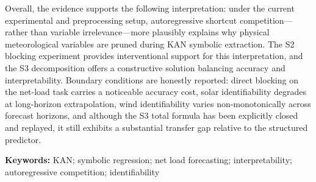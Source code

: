 Overall, the evidence supports the following interpretation: under the current experimental and preprocessing setup, autoregressive shortcut competition---rather than variable irrelevance---more plausibly explains why physical meteorological variables are pruned during KAN symbolic extraction. The S2 blocking experiment provides interventional support for this interpretation, and the S3 decomposition offers a constructive solution balancing accuracy and interpretability. Boundary conditions are honestly reported: direct blocking on the net-load task carries a noticeable accuracy cost, solar identifiability degrades at long-horizon extrapolation, wind identifiability varies non-monotonically across forecast horizons, and although the S3 total formula has been explicitly closed and replayed, it still exhibits a substantial transfer gap relative to the structured predictor.

\vspace{1em}
\noindent\textbf{Keywords:} KAN; symbolic regression; net load forecasting; interpretability; autoregressive competition; identifiability
